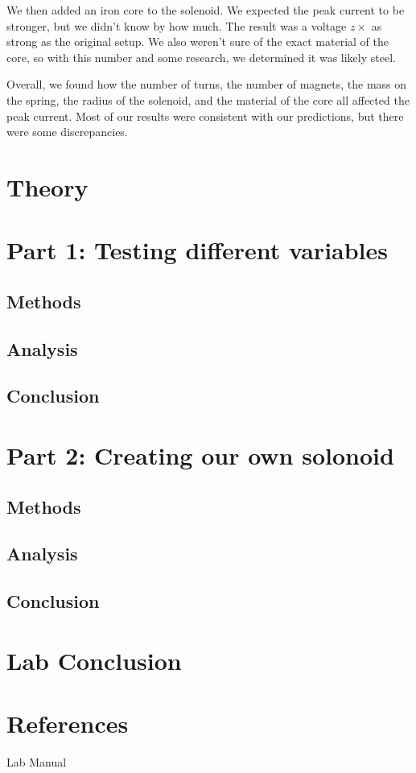 \documentclass[11pt]{article}
\let\oldsection\section
\renewcommand\section{\clearpage\oldsection}
\begin{document}
    We then added an iron core to the solenoid.
    We expected the peak current to be stronger, but we didn't know by how much.
    The result was a voltage $z \times$ as strong as the original setup.
    We also weren't sure of the exact material of the core, so with this number and some research, we determined it was likely steel.

    Overall, we found how the number of turns, the number of magnets, the mass on the spring, the radius of the solenoid, and the material of the core all affected the peak current.
    Most of our results were consistent with our predictions, but there were some discrepancies.

    \section*{Theory}\label{sec:theory}


    \section{Part 1: Testing different variables}\label{sec:part_1}
    \subsection{Methods}\label{subsec:part_1_methods}
    \subsection{Analysis}\label{subsec:part_1_analsysis}
    \subsection{Conclusion}\label{subsec:part_1_conclusion}

    \section{Part 2: Creating our own solonoid }\label{sec:part_2}
    \subsection{Methods}\label{subsec:part_2_methods}
    \subsection{Analysis}\label{subsec:part_2_analsysis}
    \subsection{Conclusion}\label{subsec:part_2_conclusion}

    \section{Lab Conclusion}\label{sec:lab_conclusion}



    \appendix
    \section{References}\label{sec:references}

    Lab Manual
\end{document}
